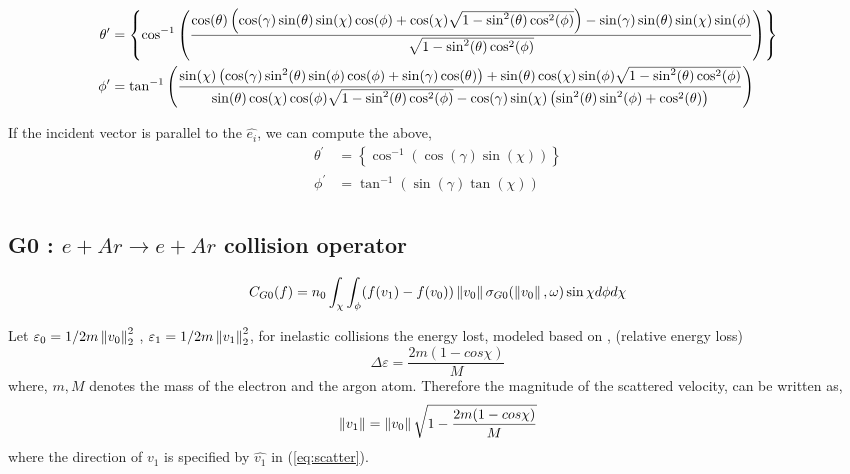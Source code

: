 \documentclass{article}
\begin{document}
\begin{align}
    \theta^\prime &= \tiny \left\{\cos ^{-1}\left(\frac{\cos (\theta ) \left(\cos (\gamma ) \sin (\theta ) \sin (\chi ) \cos (\phi )+\cos (\chi ) \sqrt{1-\sin ^2(\theta ) \cos ^2(\phi )}\right)-\sin (\gamma ) \sin (\theta ) \sin (\chi ) \sin (\phi )}{\sqrt{1-\sin ^2(\theta ) \cos ^2(\phi )}}\right)\right\} \\
    \phi^\prime &= \tan ^{-1}\left(\frac{\sin (\chi ) \left(\cos (\gamma ) \sin ^2(\theta ) \sin (\phi ) \cos (\phi )+\sin (\gamma ) \cos (\theta )\right)+\sin (\theta ) \cos (\chi ) \sin (\phi ) \sqrt{1-\sin ^2(\theta ) \cos ^2(\phi )}}{\sin (\theta ) \cos (\chi ) \cos (\phi ) \sqrt{1-\sin ^2(\theta ) \cos ^2(\phi )}-\cos (\gamma ) \sin (\chi ) \left(\sin ^2(\theta ) \sin ^2(\phi )+\cos ^2(\theta )\right)}\right)
\end{align}

If the incident vector is parallel to the $\hat{e_i}$, we can compute the above, 
\begin{align}
    \theta^\prime &=\left\{\cos ^{-1}(\cos (\gamma ) \sin (\chi ))\right\} \\
    \phi^\prime &=\tan ^{-1}(\sin (\gamma ) \tan (\chi )) \\
\end{align}




\subsection{G0 : $e + Ar \rightarrow e + Ar$ collision operator}
\begin{equation}
    C_{G0}(f) = n_0 \int_{\chi} \int_{\phi} (f(v_1) - f(v_0)) \left\lVert v_0\right\rVert \sigma_{G0}(\left\lVert v_0\right\rVert,\omega) \sin\chi d\phi d\chi
\end{equation}

Let $\varepsilon_0 = 1/2 m \left\lVert v_0\right\rVert^2_2$ , $\varepsilon_1 = 1/2 m \left\lVert v_1\right\rVert^2_2$, for inelastic collisions the energy lost, modeled based on \cite{vahedi1995monte}, (relative energy loss)
\begin{equation}
    \Delta \varepsilon = \frac{2m(1-cos\chi)}{M}
\end{equation} where, $m,M$ denotes the mass of the electron and the argon atom. Therefore the magnitude of the scattered velocity, can be written as, 
\begin{equation}
    \left\lVert v_1\right\rVert = \left\lVert v_0\right\rVert \sqrt{1- \frac{2m(1-cos\chi)}{M}}
\end{equation} where the direction of $v_1$ is specified by $\hat{v_1}$ in (\ref{eq:scatter}).
\end{document}
